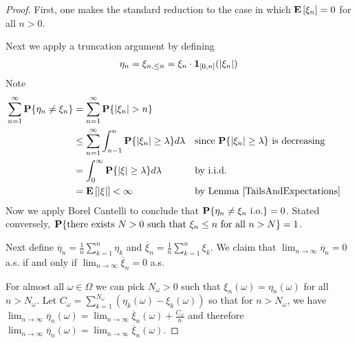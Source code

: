 \begin{proof}
First, one makes the standard reduction to the case in which
$\textbf{E}\left[\xi_n\right]= 0$ for all $n>0$.  

Next we apply a truncation argument by defining 
\begin{align*}
\eta_n = \xi_{n, \leq  n} = \xi_n \cdot \textbf{1}_{[0,n]}(\left \vert \xi_n \right \vert)
\end{align*}
Note
\begin{align*}
\sum_{n=1}^\infty \textbf{P}\{\eta_n \neq \xi_n\} &= \sum_{n=1}^\infty
\textbf{P}\{\left \vert \xi_n \right \vert > n\} \\
&\leq \sum_{n=1}^\infty \int_{n-1}^n
\textbf{P}\{\left \vert \xi_n \right \vert \geq \lambda \} d\lambda & & \text{since
  $\textbf{P}\{\left \vert \xi_n \right \vert \geq \lambda\}$ is decreasing} \\
&= \int_0^\infty \textbf{P}\{\left \vert \xi \right \vert \geq \lambda \} d\lambda & &
\text{by i.i.d. }\\
&= \textbf{E}\left[\left \vert \xi \right \vert\right] < \infty & & \text{by Lemma \ref{TailsAndExpectations}}
\end{align*}
Now we apply Borel Cantelli to conclude that $\textbf{P}\{\eta_n \neq
  \xi_n \text{ i.o.}\} = 0$.  Stated conversely,
$\textbf{P}\{\text{there exists $N>0$ such that $\xi_n \leq n$ for
    all $n > N$}\} = 1$.

Next define $\overline{\eta}_n = \frac{1}{n}\sum_{k=1}^n \eta_k$ and
$\overline{\xi}_n = \frac{1}{n}\sum_{k=1}^n \xi_k$.  We claim that
$\lim_{n \to \infty} \overline{\eta}_n = 0$ a.s. if and only if
$\lim_{n \to \infty} \overline{\xi}_n = 0$ a.s.

For almost all $\omega \in \Omega$ we can pick
$N_\omega > 0$ such that $\xi_n(\omega) = \eta_n(\omega)$ for all $n >
N_\omega$.  Let $C_\omega = \sum_{k=1}^{N_\omega} \left (
  \eta_k(\omega) - \xi_k(\omega) \right )$ so that for $n > N_\omega$,
we have $\lim_{n \to \infty} \overline{\eta}_n(\omega) = \lim_{n \to \infty}
\overline{\xi}_n(\omega) + \frac{C_\omega}{n}$ and therefore $\lim_{n
  \to \infty} \overline{\eta}_n(\omega)  = \lim_{n \to \infty}
\overline{\xi}_n(\omega) $.  


\end{proof}
